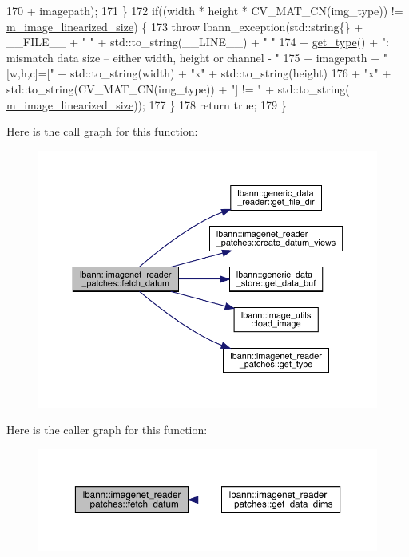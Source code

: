 \begin{DoxyCode}
170                           + imagepath);
171   \}
172   \textcolor{keywordflow}{if}((width * height * CV\_MAT\_CN(img\_type)) != \hyperlink{classlbann_1_1image__data__reader_af512f1f866c0f654309b7f28886dca9a}{m\_image\_linearized\_size}) \{
173     \textcolor{keywordflow}{throw} lbann\_exception(std::string\{\} + \_\_FILE\_\_ + \textcolor{stringliteral}{" "} + std::to\_string(\_\_LINE\_\_) + \textcolor{stringliteral}{" "}
174                           + \hyperlink{classlbann_1_1imagenet__reader__patches_adc6363b20f058260c674d92af2a6ef80}{get\_type}() + \textcolor{stringliteral}{": mismatch data size -- either width, height or channel -
       "}
175                           + imagepath + \textcolor{stringliteral}{" [w,h,c]=["} + std::to\_string(width) + \textcolor{stringliteral}{"x"} + std::to\_string(height)
176                           + \textcolor{stringliteral}{"x"} + std::to\_string(CV\_MAT\_CN(img\_type)) + \textcolor{stringliteral}{"] != "} + std::to\_string(
      \hyperlink{classlbann_1_1image__data__reader_af512f1f866c0f654309b7f28886dca9a}{m\_image\_linearized\_size}));
177   \}
178   \textcolor{keywordflow}{return} \textcolor{keyword}{true};
179 \}
\end{DoxyCode}
Here is the call graph for this function\+:\nopagebreak
\begin{figure}[H]
\begin{center}
\leavevmode
\includegraphics[width=350pt]{classlbann_1_1imagenet__reader__patches_a8a9e4a1339f2e9676a0e653853ebff3c_cgraph}
\end{center}
\end{figure}
Here is the caller graph for this function\+:\nopagebreak
\begin{figure}[H]
\begin{center}
\leavevmode
\includegraphics[width=350pt]{classlbann_1_1imagenet__reader__patches_a8a9e4a1339f2e9676a0e653853ebff3c_icgraph}
\end{center}
\end{figure}

